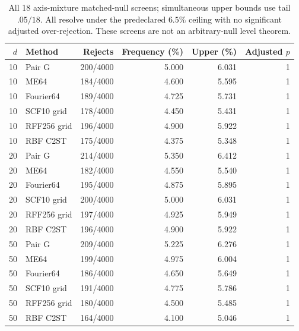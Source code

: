 \begin{table}[t]\centering\scriptsize
\caption{All 18 axis-mixture matched-null screens; simultaneous upper bounds use tail $.05/18$. All resolve under the predeclared $6.5\%$ ceiling with no significant adjusted over-rejection. These screens are not an arbitrary-null level theorem.}
\label{tab:axis-null}
{\setlength{\tabcolsep}{8pt}\renewcommand{\arraystretch}{1.2}
\begin{tabular}{rlrrrr}
\toprule
$d$ & Method & Rejects & Frequency (\%) & Upper (\%) & Adjusted $p$\\
\midrule
10 & Pair G & 200/4000 & 5.000 & 6.031 & 1\\
10 & ME64 & 184/4000 & 4.600 & 5.595 & 1\\
10 & Fourier64 & 189/4000 & 4.725 & 5.731 & 1\\
10 & SCF10 grid & 178/4000 & 4.450 & 5.431 & 1\\
10 & RFF256 grid & 196/4000 & 4.900 & 5.922 & 1\\
10 & RBF C2ST & 175/4000 & 4.375 & 5.348 & 1\\
20 & Pair G & 214/4000 & 5.350 & 6.412 & 1\\
20 & ME64 & 182/4000 & 4.550 & 5.540 & 1\\
20 & Fourier64 & 195/4000 & 4.875 & 5.895 & 1\\
20 & SCF10 grid & 200/4000 & 5.000 & 6.031 & 1\\
20 & RFF256 grid & 197/4000 & 4.925 & 5.949 & 1\\
20 & RBF C2ST & 196/4000 & 4.900 & 5.922 & 1\\
50 & Pair G & 209/4000 & 5.225 & 6.276 & 1\\
50 & ME64 & 199/4000 & 4.975 & 6.004 & 1\\
50 & Fourier64 & 186/4000 & 4.650 & 5.649 & 1\\
50 & SCF10 grid & 191/4000 & 4.775 & 5.786 & 1\\
50 & RFF256 grid & 180/4000 & 4.500 & 5.485 & 1\\
50 & RBF C2ST & 164/4000 & 4.100 & 5.046 & 1\\
\bottomrule
\end{tabular}}
\end{table}

